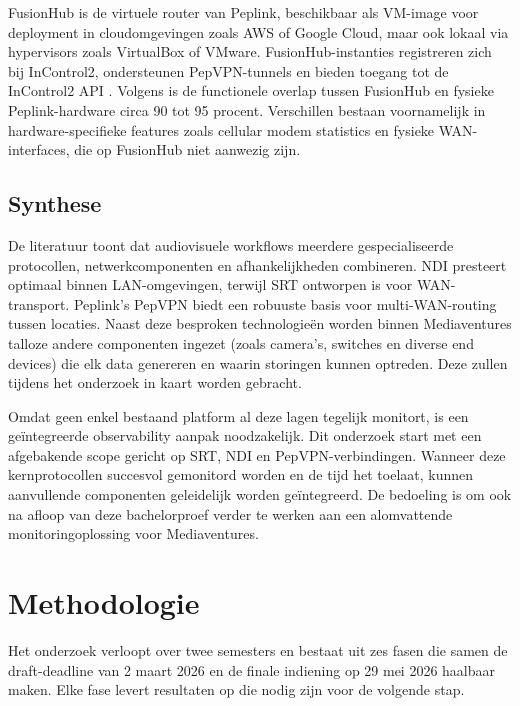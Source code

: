 FusionHub is de virtuele router van Peplink, beschikbaar als VM-image voor deployment in cloudomgevingen zoals AWS of Google Cloud, maar ook lokaal via hypervisors zoals VirtualBox of VMware. FusionHub-instanties registreren zich bij InControl2, ondersteunen PepVPN-tunnels en bieden toegang tot de InControl2 API \autocite{Peplink2023}.
Volgens \textcite{VanRenterghem2025} is de functionele overlap tussen FusionHub en fysieke Peplink-hardware circa 90 tot 95 procent. Verschillen bestaan voornamelijk in hardware-specifieke features zoals cellular modem statistics en fysieke WAN-interfaces, die op FusionHub niet aanwezig zijn.
\subsection{Synthese}

De literatuur toont dat audiovisuele workflows meerdere gespecialiseerde protocollen, netwerkcomponenten en afhankelijkheden combineren. NDI presteert optimaal binnen LAN-omgevingen, terwijl SRT ontworpen is voor WAN-transport. Peplink's PepVPN biedt een robuuste basis voor multi-WAN-routing tussen locaties. Naast deze besproken technologieën worden binnen Mediaventures talloze andere componenten ingezet (zoals camera's, switches en diverse end devices) die elk data genereren en waarin storingen kunnen optreden. Deze zullen tijdens het onderzoek in kaart worden gebracht.

Omdat geen enkel bestaand platform al deze lagen tegelijk monitort, is een geïntegreerde observability aanpak noodzakelijk. Dit onderzoek start met een afgebakende scope gericht op SRT, NDI en PepVPN-verbindingen. Wanneer deze kernprotocollen succesvol gemonitord worden en de tijd het toelaat, kunnen aanvullende componenten geleidelijk worden geïntegreerd. De bedoeling is om ook na afloop van deze bachelorproef verder te werken aan een alomvattende monitoringoplossing voor Mediaventures. 


\section{Methodologie}
\label{sec:methodologie}

Het onderzoek verloopt over twee semesters en bestaat uit zes fasen die samen de draft-deadline van 2 maart 2026 en de finale indiening op 29 mei 2026 haalbaar maken. Elke fase levert resultaten op die nodig zijn voor de volgende stap.

